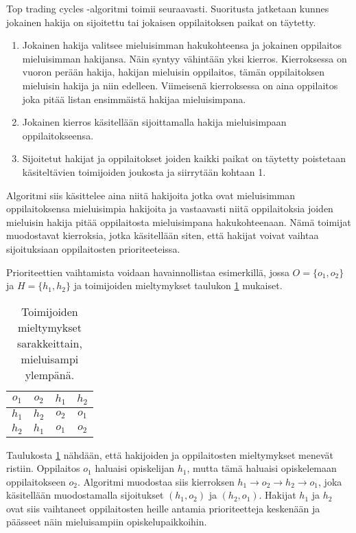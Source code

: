 \documentclass[twoside]{tktltiki}
\begin{document}
Top trading cycles -algoritmi toimii seuraavasti. Suoritusta jatketaan
kunnes jokainen hakija on sijoitettu tai jokaisen oppilaitoksen paikat
on täytetty.
\begin{enumerate}

\item Jokainen hakija valitsee mieluisimman hakukohteensa ja jokainen
  oppilaitos mieluisimman hakijansa. Näin syntyy vähintään yksi
  kierros. Kierroksessa on vuoron perään hakija, hakijan mieluisin
  oppilaitos, tämän oppilaitoksen mieluisin hakija ja niin edelleen.
  Viimeisenä kierroksessa on aina oppilaitos joka pitää listan
  ensimmäistä hakijaa mieluisimpana.

\item Jokainen kierros käsitellään sijoittamalla hakija mieluisimpaan
  oppilaitokseensa.

\item Sijoitetut hakijat ja oppilaitokset joiden kaikki paikat on
  täytetty poistetaan käsiteltävien toimijoiden joukosta ja siirrytään
  kohtaan 1.
\end{enumerate}

Algoritmi siis käsittelee aina niitä hakijoita jotka ovat mieluisimman
oppilaitoksensa mieluisimpia hakijoita ja vastaavasti niitä
oppilaitoksia joiden mieluisin hakija pitää oppilaitosta mieluisimpana
hakukohteenaan. Nämä toimijat muodostavat kierroksia, jotka
käsitellään siten, että hakijat voivat vaihtaa sijoituksiaan
oppilaitosten prioriteeteissa.

Prioriteettien vaihtamista voidaan havainnollistaa esimerkillä, jossa
$O = \{o_1, o_2\}$ ja $H = \{h_1, h_2\}$ ja toimijoiden mieltymykset
taulukon \ref{top_esimerkki} mukaiset.

\begin{table}[ht]
  \begin{center}
    \begin{tabular}{ c c | c c }
    $o_1$ & $o_2$ & $h_1$ & $h_2$ \\
    \hline
    $h_1$ & $h_2$ & $o_2$ & $o_1$ \\
    $h_2$ & $h_1$ & $o_1$ & $o_2$
    \end{tabular}
    \caption{Toimijoiden mieltymykset sarakkeittain, mieluisampi ylempänä.}
    \label{top_esimerkki}
  \end{center}
\end{table}

Taulukosta \ref{top_esimerkki} nähdään, että hakijoiden ja
oppilaitosten mieltymykset menevät ristiin. Oppilaitos $o_1$ haluaisi
opiskelijan $h_1$, mutta tämä haluaisi opiskelemaan oppilaitokseen
$o_2$. Algoritmi muodostaa siis kierroksen $h_1 \rightarrow o_2
\rightarrow h_2 \rightarrow o_1$, joka käsitellään muodostamalla
sijoitukset $(h_1, o_2)$ ja $(h_2, o_1)$. Hakijat $h_1$ ja $h_2$ ovat
siis vaihtaneet oppilaitosten heille antamia prioriteetteja keskenään
ja päässeet näin mieluisampiin opiskelupaikkoihin.
\end{document}

